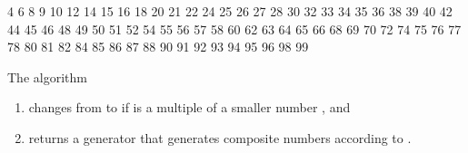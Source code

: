 \documentclass[letterpaper,10pt,english]{sphinxmanual}
\begin{document}
\begin{sphinxVerbatim}[commandchars=\\\{\}]
 
      \PYG{p}{[}\PYG{p}{]}    
       
         \PYG{p}{[}\PYG{p}{]} 
           
            \PYG{p}{[}\PYG{p}{]}  
           \PYG{p}{[}\PYG{p}{]}

     
\end{sphinxVerbatim}

\begin{sphinxVerbatim}[commandchars=\\\{\}]
4 6 8 9 10 12 14 15 16 18 20 21 22 24 25 26 27 28 30 32 33 34 35 36 38 39 40 42 44 45 46 48 49 50 51 52 54 55 56 57 58 60 62 63 64 65 66 68 69 70 72 74 75 76 77 78 80 81 82 84 85 86 87 88 90 91 92 93 94 95 96 98 99 
\end{sphinxVerbatim}

The algorithm
\begin{enumerate}
%
\item {} 
changes  from  to  if  is a multiple of a smaller number , and

\item {} 
returns a generator that generates composite numbers according to .

\end{enumerate}
\end{document}
